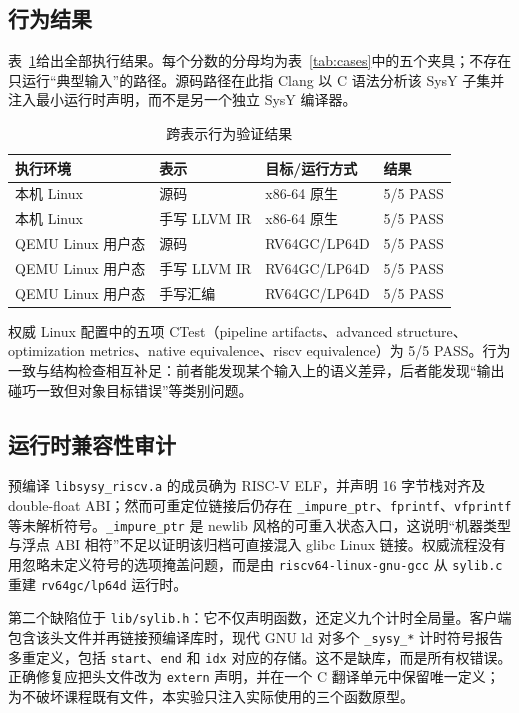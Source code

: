 \subsection{行为结果}

表~\ref{tab:behavior}给出全部执行结果。每个分数的分母均为表~\ref{tab:cases}中的五个夹具；不存在只运行“典型输入”的路径。源码路径在此指 Clang 以 C 语法分析该 SysY 子集并注入最小运行时声明，而不是另一个独立 SysY 编译器。

\begin{table}
\caption{跨表示行为验证结果}
\label{tab:behavior}
\centering
\begin{tabular}{llll}
\toprule
执行环境 & 表示 & 目标/运行方式 & 结果 \\
\midrule
本机 Linux & 源码 & x86-64 原生 & 5/5 PASS \\
本机 Linux & 手写 LLVM IR & x86-64 原生 & 5/5 PASS \\
QEMU Linux 用户态 & 源码 & RV64GC/LP64D & 5/5 PASS \\
QEMU Linux 用户态 & 手写 LLVM IR & RV64GC/LP64D & 5/5 PASS \\
QEMU Linux 用户态 & 手写汇编 & RV64GC/LP64D & 5/5 PASS \\
\bottomrule
\end{tabular}
\end{table}

权威 Linux 配置中的五项 CTest（pipeline artifacts、advanced structure、optimization metrics、native equivalence、riscv equivalence）为 5/5 PASS。行为一致与结构检查相互补足：前者能发现某个输入上的语义差异，后者能发现“输出碰巧一致但对象目标错误”等类别问题。

\subsection{运行时兼容性审计}

预编译 \texttt{libsysy\_riscv.a} 的成员确为 RISC-V ELF，并声明 16 字节栈对齐及 double-float ABI；然而可重定位链接后仍存在 \texttt{\_impure\_ptr}、\texttt{fprintf}、\texttt{vfprintf} 等未解析符号。\texttt{\_impure\_ptr} 是 newlib 风格的可重入状态入口，这说明“机器类型与浮点 ABI 相符”不足以证明该归档可直接混入 glibc Linux 链接。权威流程没有用忽略未定义符号的选项掩盖问题，而是由 \texttt{riscv64-linux-gnu-gcc} 从 \texttt{sylib.c} 重建 \texttt{rv64gc/lp64d} 运行时。

第二个缺陷位于 \texttt{lib/sylib.h}：它不仅声明函数，还定义九个计时全局量。客户端包含该头文件并再链接预编译库时，现代 GNU ld 对多个 \texttt{\_sysy\_*} 计时符号报告多重定义，包括 \texttt{start}、\texttt{end} 和 \texttt{idx} 对应的存储。这不是缺库，而是所有权错误。正确修复应把头文件改为 \texttt{extern} 声明，并在一个 C 翻译单元中保留唯一定义；为不破坏课程既有文件，本实验只注入实际使用的三个函数原型。
